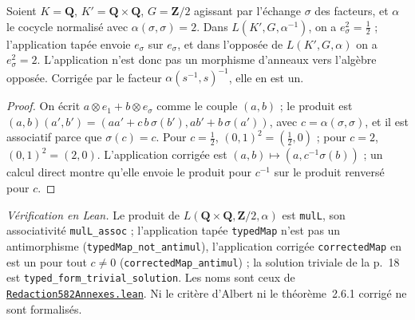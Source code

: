 \begin{encadre}
\begin{contrexemple}
Soient $K = \mathbf Q$, $K' = \mathbf Q \times \mathbf Q$, $G = \mathbf Z/2$ agissant par l'échange $\sigma$ des facteurs, et $\alpha$ le cocycle normalisé avec $\alpha(\sigma, \sigma) = 2$. Dans $L(K', G, \alpha^{-1})$, on a $e_\sigma^2 = \tfrac12$ ; l'application tapée envoie $e_\sigma$ sur $e_\sigma$, et dans l'opposée de $L(K', G, \alpha)$ on a $e_\sigma^2 = 2$. L'application n'est donc pas un morphisme d'anneaux vers l'algèbre opposée. Corrigée par le facteur $\alpha(s^{-1}, s)^{-1}$, elle en est un.
\end{contrexemple}
\end{encadre}

\begin{proof}
On écrit $a \otimes e_1 + b \otimes e_\sigma$ comme le couple $(a, b)$ ; le produit est $(a, b)(a', b') = (aa' + c\, b\,\sigma(b'), ab' + b\,\sigma(a'))$, avec $c = \alpha(\sigma, \sigma)$, et il est associatif parce que $\sigma(c) = c$. Pour $c = \tfrac12$, $(0,1)^2 = (\tfrac12, 0)$ ; pour $c = 2$, $(0,1)^2 = (2, 0)$. L'application corrigée est $(a, b) \mapsto (a, c^{-1}\sigma(b))$ ; un calcul direct montre qu'elle envoie le produit pour $c^{-1}$ sur le produit renversé pour $c$.
\end{proof}

\begin{sloppypar}
\noindent\emph{Vérification en Lean.} Le produit de $L(\mathbf Q \times \mathbf Q, \mathbf Z/2, \alpha)$ est \texttt{mulL}, son associativité \texttt{mulL\_assoc} ; l'application tapée \texttt{typedMap} n'est pas un antimorphisme (\texttt{typedMap\_not\_antimul}), l'application corrigée \texttt{correctedMap} en est un pour tout $c \neq 0$ (\texttt{correctedMap\_antimul}) ; la solution triviale de la p.~18 est \texttt{typed\_form\_trivial\_solution}. Les noms sont ceux de \href{\leanblobmain/Redaction582Annexes.lean}{\texttt{Redaction582Annexes.\allowbreak{}lean}}. Ni le critère d'Albert ni le théorème~2.6.1 corrigé ne sont formalisés.
\end{sloppypar}
